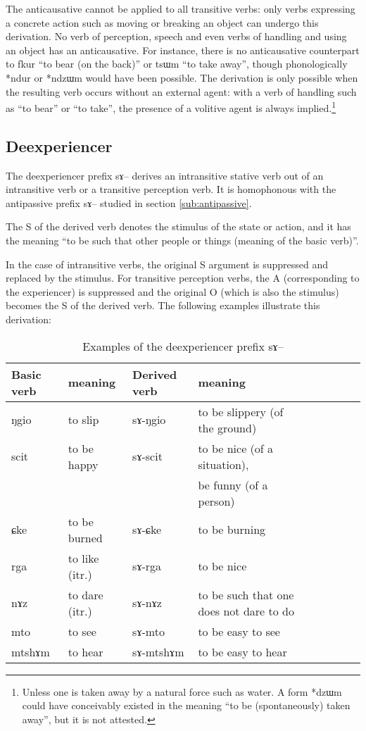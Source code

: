 \documentclass[oldfontcommands,oneside,a4paper,11pt]{memoir}
\newcommand{\ipa}[1]{{\phon #1}} %
\begin{document}
The anticausative cannot be applied to all transitive verbs: only verbs expressing a concrete action such as moving or breaking an object can undergo this derivation. No verb of perception, speech  and even verbs of handling and using an object has an anticausative. For instance, there is no anticausative counterpart to \ipa{fkur} ``to bear (on the back)'' or \ipa{tsɯm} ``to take away'', though phonologically *ndur or *ndzɯm would have been possible. The derivation is only possible when the resulting verb occurs without an external agent: with a verb of handling such as ``to bear'' or ``to take'', the presence of a volitive agent is always implied.\footnote{Unless one is taken away by a natural force such as water. A form *dzɯm could have conceivably existed in the meaning ``to be (spontaneously) taken away'', but it is not attested.} 


\subsection{Deexperiencer} \label{sub:deexperiencer}

The deexperiencer prefix \ipa{sɤ}-- derives an intransitive stative verb out of an intransitive verb or a transitive perception verb. It is homophonous with the antipassive prefix \ipa{sɤ}-- studied in section \ref{sub:antipassive}.

The S of the derived verb denotes the stimulus of the state or action, and it has the meaning ``to be such that other people or things (meaning of the basic verb)''. 
 
In the case of intransitive verbs, the original S argument is suppressed and replaced by the stimulus. For transitive perception verbs, the A (corresponding to the experiencer) is suppressed and the original O (which is also the stimulus) becomes the S of the derived verb. The following examples illustrate this derivation:


\begin{table}[H]
\caption{Examples of the deexperiencer prefix \ipa{sɤ}-- }\label{tab:deexperiencer}
\begin{tabular}{lllllllll} \toprule
 
Basic verb	&meaning	&Derived verb	&meaning\\
\midrule
\ipa{ŋgio}  &	to slip 	& \ipa{sɤ-ŋgio}  &	  to be slippery (of the ground)\\
\ipa{scit}  &	  to be happy	& \ipa{sɤ-scit}  &	  to be nice (of a situation), \\ &&& be funny (of a person)\\
\ipa{ɕke}  &	   to be burned 	& \ipa{sɤ-ɕke}  &	  to be burning \\
\ipa{rga}  &	  to like (itr.)	& \ipa{sɤ-rga}  &	  to be nice\\
\ipa{nɤz}  &	  to dare (itr.)	& \ipa{sɤ-nɤz}  &	  to be such that one does not dare to do \\
\midrule
\ipa{mto}  &	 to  see	& \ipa{sɤ-mto}  &	  to be easy to see\\
\ipa{mtshɤm}  &	  to hear	& \ipa{sɤ-mtshɤm}  &	  to be easy to hear\\
\bottomrule
\end{tabular}
\end{table}
\end{document}
